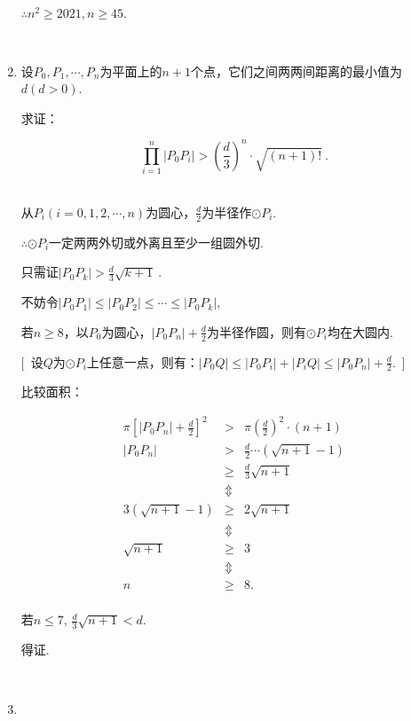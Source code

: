 \documentclass[8pt]{article}
\begin{document}
\begin{enumerate}
			$\therefore n^2 \geq 2021, n \geq 45.$

		~\\

		\item

			设$P_0, P_1, \cdots, P_n$为平面上的$n+1$个点，它们之间两两间距离的最小值为$d(d>0)$. 

			求证：

			$$\prod_{i=1}^{n}\left|P_0P_i\right|>\left(\frac{d}{3}\right)^n\cdot\sqrt{(n+1)!}\ .$$

			~\\
			从$P_i(i=0,1,2,\cdots,n)$为圆心，$\frac{d}{2}$为半径作$\odot P_i$.

			$\therefore \odot P_i$一定两两外切或外离且至少一组圆外切.

			只需证$\left|P_0P_k\right|>\frac{d}{3}\sqrt{k+1}\ .$

			不妨令$\left|P_0P_1\right|\leq\left|P_0P_2\right|\leq\cdots\leq\left|P_0P_k\right|,$

			若$n\geq8$，以$P_0$为圆心，$\left|P_0P_n\right|+\frac{d}{2}$为半径作圆，则有$\odot P_i$均在大圆内.

			[\ 设$Q$为$\odot P_i$上任意一点，则有：$\left|P_0Q\right|\leq\left|P_0P_i\right|+\left|P_iQ\right|\leq\left|P_0P_n\right|+\frac{d}{2}$.\ ]

			比较面积：

			$$
			\begin{array}{rcl}
				\pi \left[\left|P_0P_n\right|+\frac{d}{2}\right]^2&>&\pi\left(\frac{d}{2}\right)^2\cdot(n+1)\\
				\left|P_0P_n\right|&>&\frac{d}{2}\cdots\left(\sqrt{n+1}-1\right)\\
				&\geq&\frac{d}{3}\sqrt{n+1}\\
				&\Updownarrow&\\
				3\left(\sqrt{n+1}-1\right)&\geq&2\sqrt{n+1}\\
				&\Updownarrow&\\
				\sqrt{n+1}&\geq&3\\
				&\Updownarrow&\\
				n&\geq&8.\\
			\end{array}
			$$

			若$n\leq 7$, $\frac{d}{3}\sqrt{n+1}<d.$

			得证.

		~\\

		\item


\end{enumerate}
\end{document}
